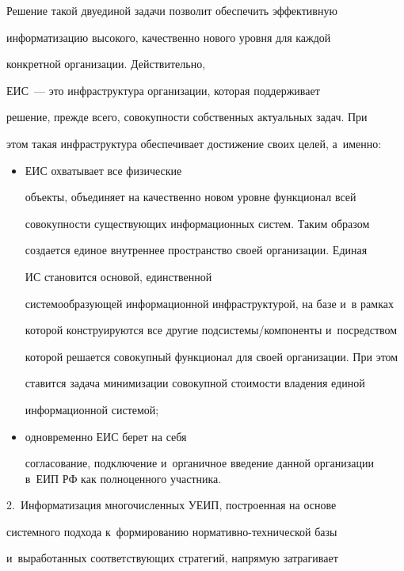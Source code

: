      

     Решение такой двуединой задачи позволит обеспечить эффективную 

информатизацию высокого, качественно нового уровня для каждой 

конкретной организации. Действительно, 

ЕИС~--- это инфраструктура организации, которая поддерживает 

решение, прежде всего, совокупности собственных актуальных задач. При 

этом такая инфраструктура обеспечивает достижение своих целей, а~именно:

     \begin{itemize}

     \item  ЕИС охватывает все физические 

объекты, объединяет на качественно новом уровне функционал всей 

совокупности существующих информационных систем. Таким образом 

создается единое внутреннее пространство своей организации. Единая 

ИС становится основой, единственной 

системообразующей информационной инфраструктурой, на базе и~в рамках 

которой конструируются все другие подсистемы/компоненты и~посредством 

которой решается совокупный функционал для своей организации. При этом 

ставится задача минимизации совокупной стоимости владения единой 

информационной системой;

     \item одновременно ЕИС берет на себя 

согласование, подключение и~органичное введение данной организации в~ЕИП РФ как полноценного участника.

     \end{itemize}

     

     \smallskip

     

     2.\ Информатизация многочисленных УЕИП, построенная на основе 

системного подхода к~формированию нормативно-технической базы 

и~выработанных соответствующих стратегий, напрямую затрагивает 

